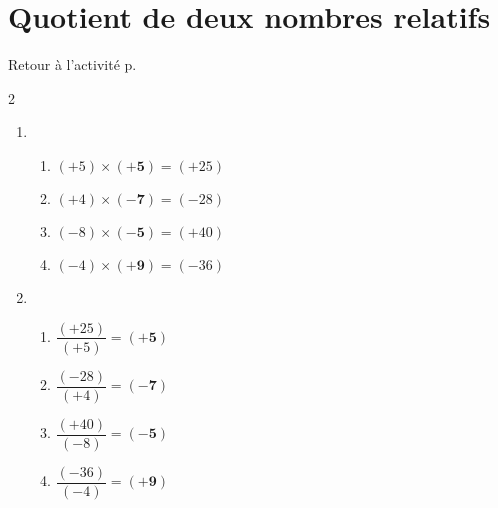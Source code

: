  \label{corrN1activite004}
\section*{Quotient de deux nombres relatifs}
Retour à l'activité p. \hyperref[N1activite004]{\pageref{N1activite004}}

\begin{multicols}2
    \begin{enumerate}
        \item 
        \begin{enumerate}
            \item $(+5)\times \mathbf{(+5)} = (+25)$
            \item $(+4)\times \mathbf{(-7)} = (-28)$
            \item $(-8)\times \mathbf{(-5)} = (+40)$
            \item $(-4)\times \mathbf{(+9)} = (-36)$
        \end{enumerate}
        \columnbreak        
        \item 
        \begin{enumerate}
            \item $\dfrac{(+25)}{(+5)} = \mathbf{(+5)}$
            \item $\dfrac{(-28)}{(+4)} = \mathbf{(-7)}$
            \item $\dfrac{(+40)}{(-8)} = \mathbf{(-5)} $
            \item $\dfrac{(-36)}{(-4)} = \mathbf{(+9)}$    
        \end{enumerate}
    \end{enumerate}    
\end{multicols}
